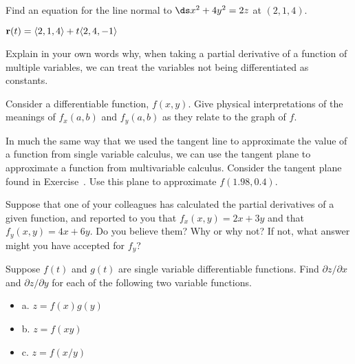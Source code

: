 \begin{exercises}
\exercise Find an equation for the line normal to 
$\ds x^2+4y^2=2z$ at
$(2,1,4)$. 
\begin{answer} ${\bf r}(t)=\langle 2,1,4\rangle+t\langle 2,4,-1\rangle$
\end{answer}

\exercise Explain in your own words why, when taking a partial derivative
  of a function of multiple variables, we can treat the variables not
  being differentiated as constants.

\exercise Consider a differentiable function, $f(x,y)$.  Give physical
  interpretations of the meanings of $f_x(a,b)$ and $f_y(a,b)$ as they
  relate to the graph of $f$.

  \exercise In much the same way that we used the tangent line to
  approximate the value of a function from single variable calculus,
  we can use the tangent plane to approximate a function from
  multivariable calculus.  Consider the tangent plane found in
  Exercise~. Use this plane to approximate
  $f(1.98, 0.4)$.

\exercise Suppose that one of your colleagues has calculated the partial
  derivatives of a given function, and reported to you that
  $f_x(x,y)=2x+3y$ and that $f_y(x,y)=4x+6y$.  Do you believe them?
  Why or why not?  If not, what answer might you have accepted for
  $f_y$?

\exercise Suppose $f(t)$ and $g(t)$ are single variable differentiable
  functions.  Find $\partial z/\partial x$ and
  $\partial z/\partial y$ for each of the following two variable functions.

\begin{itemize} %
\item{a.} $z=f(x)g(y)$
\item{b.} $z=f(xy)$
\item{c.} $z=f(x/y)$
\end{itemize}


\end{exercises}

